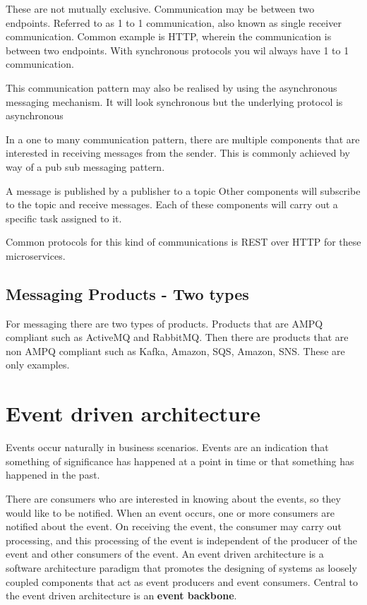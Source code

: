 \documentclass[a4paper, 11pt]{book}
\begin{document}
    These are not mutually exclusive.
    Communication may be between two endpoints.
    Referred to as 1 to 1 communication, also known as single receiver communication.
    Common example is HTTP, wherein the communication is between two endpoints.
    With synchronous protocols you wil always have 1 to 1 communication.

    This communication pattern may also be realised by using the asynchronous messaging mechanism.
    It will look synchronous but the underlying protocol is asynchronous

    In a one to many communication pattern, there are multiple components that are interested in receiving messages from the sender.
    This is commonly achieved by way of a pub sub messaging pattern.
    \begin{list}
        \list A message is published by a publisher to a topic
        \list Other components will subscribe to the topic and receive messages.
        \list Each of these components will carry out a specific task assigned to it.
    \end{list}

    Common protocols for this kind of communications is REST over HTTP for these microservices.

    \subsection{Messaging Products - Two types}
    For messaging there are two types of products.
    Products that are AMPQ compliant such as ActiveMQ and RabbitMQ.
    Then there are products that are non AMPQ compliant such as Kafka, Amazon, SQS, Amazon, SNS. These are only examples.



    \section{Event driven architecture}
    Events occur naturally in business scenarios.
    Events are an indication that something of significance has happened at a point in time or that something has happened in the past.

    There are consumers who are interested in knowing about the events, so they would like to be notified.
    When an event occurs, one or more consumers are notified about the event.
    On receiving the event, the consumer may carry out processing, and this processing of the event is independent of the producer of the event and other consumers of the event.
    An event driven architecture is a software architecture paradigm that promotes the designing of systems as loosely coupled components that act as event producers and event consumers.
    Central to the event driven architecture is an \textbf{event backbone}.
\end{document}
